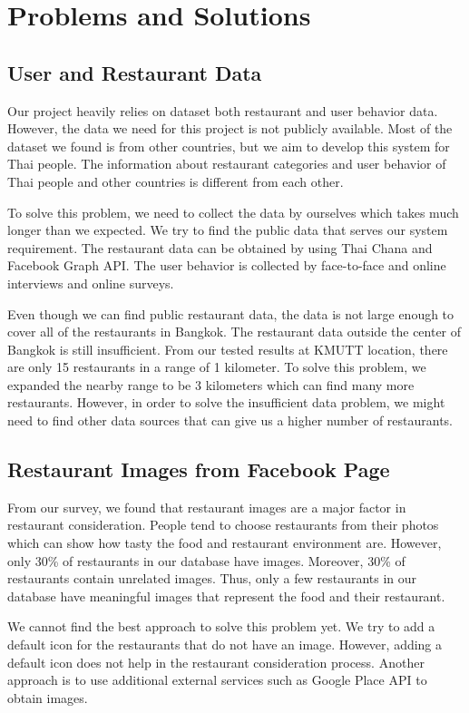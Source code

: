 \documentclass[12pt,oneside,openright,a4paper]{cpe-english-project}
\begin{document}
\section{Problems and Solutions}

\subsection{User and Restaurant Data}

Our project heavily relies on dataset both restaurant and user behavior data. However, the data we need for this project is not publicly available. Most of the dataset we found is from other countries, but we aim to develop this system for Thai people. The information about restaurant categories and user behavior of Thai people and other countries is different from each other.

To solve this problem, we need to collect the data by ourselves which takes much longer than we expected. We try to find the public data that serves our system requirement. The restaurant data can be obtained by using Thai Chana and Facebook Graph API. The user behavior is collected by face-to-face and online interviews and online surveys.

Even though we can find public restaurant data, the data is not large enough to cover all of the restaurants in Bangkok. The restaurant data outside the center of Bangkok is still insufficient. From our tested results at KMUTT location, there are only 15 restaurants in a range of 1 kilometer. To solve this problem, we expanded the nearby range to be 3 kilometers which can find many more restaurants. However, in order to solve the insufficient data problem, we might need to find other data sources that can give us a higher number of restaurants.

\subsection{Restaurant Images from Facebook Page}
From our survey, we found that restaurant images are a major factor in restaurant consideration. People tend to choose restaurants from their photos which can show how tasty the food and restaurant environment are. However, only 30\% of restaurants in our database have images. Moreover, 30\% of restaurants contain unrelated images. Thus, only a few restaurants in our database have meaningful images that represent the food and their restaurant.

We cannot find the best approach to solve this problem yet. We try to add a default icon for the restaurants that do not have an image. However, adding a default icon does not help in the restaurant consideration process. Another approach is to use additional external services such as Google Place API to obtain images.
\end{document}
